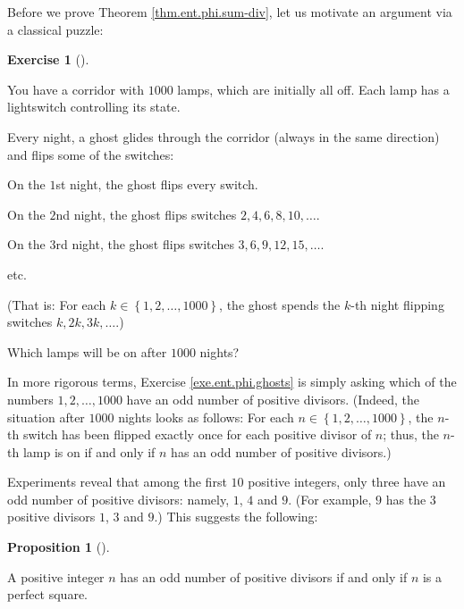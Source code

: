 \documentclass[numbers=enddot,12pt,final,onecolumn,notitlepage]{scrartcl}%
\newcounter{exer}
\numberwithin{exer}{subsection}
\theoremstyle{definition}
\newtheorem{prop}[theo]{Proposition}
\newenvironment{proposition}[1][]
{\begin{prop}[#1]\begin{leftbar}}
{\end{leftbar}\end{prop}}
\newtheorem{exmp}[exer]{Exercise}
\newenvironment{exercise}[1][]
{\begin{exmp}[#1]\begin{leftbar}}
{\end{leftbar}\end{exmp}}
\begin{document}
Before we prove Theorem \ref{thm.ent.phi.sum-div}, let us motivate an argument
via a classical puzzle:

\begin{exercise}
\label{exe.ent.phi.ghosts}You have a corridor with $1000$ lamps, which are
initially all off. Each lamp has a lightswitch controlling its state.

Every night, a ghost glides through the corridor (always in the same
direction) and flips some of the switches:

On the $1$st night, the ghost flips every switch.

On the $2$nd night, the ghost flips switches $2,4,6,8,10,\ldots$.

On the $3$rd night, the ghost flips switches $3,6,9,12,15,\ldots$.

etc.

(That is: For each $k\in\left\{  1,2,\ldots,1000\right\}  $, the ghost spends
the $k$-th night flipping switches $k,2k,3k,\ldots$.)

Which lamps will be on after $1000$ nights?
\end{exercise}

In more rigorous terms, Exercise \ref{exe.ent.phi.ghosts} is simply asking
which of the numbers $1,2,\ldots,1000$ have an odd number of positive
divisors. (Indeed, the situation after $1000$ nights looks as follows: For
each $n\in\left\{  1,2,\ldots,1000\right\}  $, the $n$-th switch has been
flipped exactly once for each positive divisor of $n$; thus, the $n$-th lamp
is on if and only if $n$ has an odd number of positive divisors.)

Experiments reveal that among the first $10$ positive integers, only three
have an odd number of positive divisors: namely, $1$, $4$ and $9$. (For
example, $9$ has the $3$ positive divisors $1$, $3$ and $9$.) This suggests
the following:

\begin{proposition}
\label{prop.ent.phi.ghosts}A positive integer $n$ has an odd number of
positive divisors if and only if $n$ is a perfect square.
\end{proposition}
\end{document}
